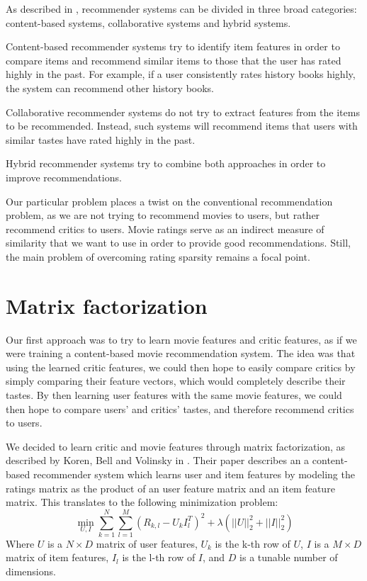 \documentclass[12pt]{article}
\begin{document}
As described in \cite{Survey05}, recommender systems can be divided in three broad categories: content-based systems, collaborative systems and hybrid systems. 

Content-based recommender systems try to identify item features in order to compare items and recommend similar items to those that the user has rated highly in the past.  For example, if a user consistently rates history books highly, the system can recommend other history books.

Collaborative recommender systems do not try to extract features from the items
to be recommended. Instead, such systems will recommend items that users with similar tastes have rated highly in the past.

Hybrid recommender systems try to combine both approaches in order to improve recommendations.

Our particular problem places a twist on the conventional recommendation problem, as we are not trying to recommend movies to users, but rather recommend critics to users. Movie ratings serve as an indirect measure of similarity that we want to use in order to provide good recommendations. Still, the main problem of overcoming rating sparsity remains a focal point.

\section{Matrix factorization}

Our first approach was to try to learn movie features and critic features, as if we were training a content-based movie recommendation system. The idea was that using the learned critic features, we could then hope to easily compare critics by simply comparing their feature vectors, which would completely describe their tastes. By then learning user features with the same movie features, we could then hope to compare users' and critics' tastes, and therefore recommend critics to users. 

We decided to learn critic and movie features through matrix factorization, as described by Koren, Bell and Volinsky in \cite{Koren09}. Their paper describes an a content-based recommender system which learns user and item features by modeling the ratings matrix as the product of an user feature matrix and an item feature matrix. This translates to the following minimization problem:
$$ \min_{U,I} \sum_{k = 1}^{N} \sum_{l = 1}^{M} (R_{k,l} - U_k I_l^T)^2 + \lambda (||U||_2^2 + ||I||_2^2) $$
Where $U$ is a $N \times D$ matrix of user features, $U_k$ is the k-th row of $U$, $I$ is a $M \times D$ matrix of item features, $I_l$ is the l-th row of $I$, and $D$ is a tunable number of dimensions.
\end{document}
